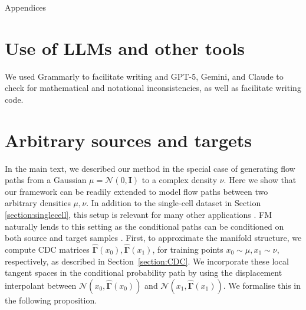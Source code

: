 \documentclass{article} %
\newcommand{\N}{\mathcal{N}}
\newcommand{\I}{\mathbf{I}}
\newcommand{\G}{\widehat{\mathbf{\Gamma}}}
\begin{document}
\newpage

\appendix

\renewcommand{\thefigure}{A\arabic{figure}}
\renewcommand{\thetable}{A\arabic{table}}

\setcounter{figure}{0}
\setcounter{table}{0}
\begin{center}
    \LARGE Appendices
\end{center}

\section*{Use of LLMs and other tools} We used Grammarly to facilitate writing and GPT-5, Gemini, and Claude to check for mathematical and notational inconsistencies, as well as facilitate writing code.

\section{Arbitrary sources and targets}\label{sec:any-dist}

In the main text, we described our method in the special case of generating flow paths from a Gaussian $\mu=\N(0,\I)$ to a complex density $\nu$.
Here we show that our framework can be readily extended to model flow paths between two arbitrary densities $\mu,\nu$.
In addition to the single-cell dataset in Section \ref{section:singlecell}, this setup is relevant for many other applications \citep{liu_rectified_2022, albergo_stochastic_2023}. 
FM naturally lends to this setting as the conditional paths can be conditioned on both source and target samples \citep{tong_improving_2024}. 
First, to approximate the manifold structure, we compute CDC matrices $\G(x_0), \G(x_1)$, for training points $x_0\sim \mu,x_1\sim \nu$, respectively, as described in Section~\ref{section:CDC}.
We incorporate these local tangent spaces in the conditional probability path by using the displacement interpolant between $\N(x_0, \G(x_0))$ and $\N(x_1, \G(x_1))$. 
We formalise this in the following proposition.
\end{document}

